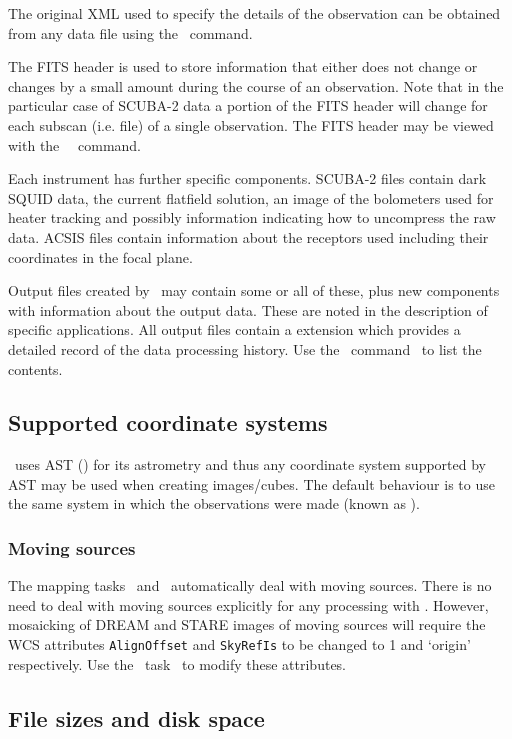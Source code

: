 \documentclass[oneside,11pt]{starlink}
\begin{document}
The original XML used to specify the details of the observation can be
obtained from any data file using the \dumpocscfg\ command.

The FITS header is used to store information that either does not
change or changes by a small amount during the course of an
observation. Note that in the particular case of SCUBA-2 data a
portion of the FITS header will change for each subscan (i.e. file) of
a single observation. The FITS header may be viewed with the \KAPPA\
\fitslist\ command.

Each instrument has further specific components. SCUBA-2 files contain
dark SQUID data, the current flatfield solution, an image of the
bolometers used for heater tracking and possibly information
indicating how to uncompress the raw data. ACSIS files contain
information about the receptors used including their coordinates in
the focal plane.

Output files created by \SMURF\ may contain some or all of these, plus
new components with information about the output data. These are noted
in the description of specific applications. All output files contain
a \ndfcomp{PROVENANCE} extension which provides a detailed record of
the data processing history. Use the \KAPPA\ command \provshow\ to list
the contents.

\subsection{Supported coordinate systems}

\SMURF\ uses AST (\astref) for its astrometry and thus any coordinate
system supported by AST may be used when creating images/cubes. The
default behaviour is to use the same system in which the observations
were made (known as \aparam{TRACKING}).

\subsubsection{Moving sources}

The mapping tasks \makemap\ and \makecube\ automatically
deal with moving sources. There is no need to deal with moving sources
explicitly for any processing with \SMURF. However, mosaicking of
DREAM and STARE images of moving sources will require the WCS
attributes \verb+AlignOffset+ and \verb+SkyRefIs+ to be changed to 1
and `origin' respectively. Use the \KAPPA\ task \wcsattrib\ to
modify these attributes.

\subsection{File sizes and disk space}
\end{document}
